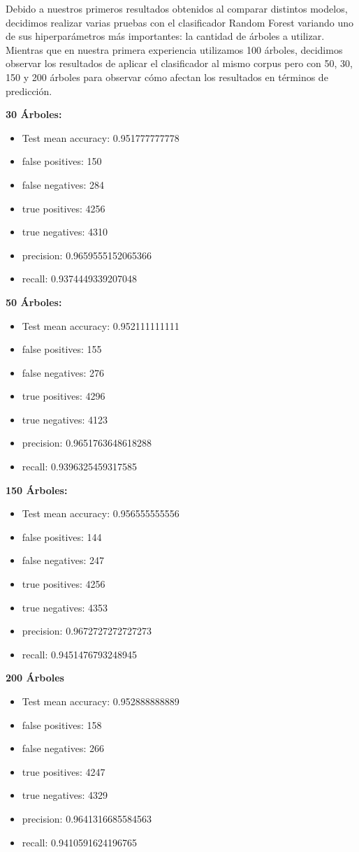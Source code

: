 \documentclass[10pt,a4paper]{article}
\begin{document}
Debido a nuestros primeros resultados obtenidos al comparar distintos modelos, decidimos realizar varias pruebas con el clasificador Random Forest variando uno de sus hiperparámetros más importantes: la cantidad de árboles a utilizar. Mientras que en nuestra primera experiencia utilizamos 100 árboles, decidimos observar los resultados de aplicar el clasificador al mismo corpus pero con 50, 30, 150 y 200 árboles para observar cómo afectan los resultados en términos de predicción.

\textbf{30 Árboles:}
\begin{itemize}
	\item Test mean accuracy: 0.951777777778
	\item false positives: 150
	\item false negatives: 284
	\item true positives:  4256
	\item true negatives:  4310
	\item precision: 0.9659555152065366
	\item recall: 0.9374449339207048
\end{itemize}

\textbf{50 Árboles:}
\begin{itemize}
	\item Test mean accuracy: 0.952111111111
	\item false positives: 155
	\item false negatives: 276
	\item true positives:  4296
	\item true negatives:  4123
	\item precision: 0.9651763648618288
	\item recall: 0.9396325459317585
\end{itemize}

\textbf{150 Árboles:}
\begin{itemize}
	\item Test mean accuracy: 0.956555555556
	\item false positives: 144
	\item false negatives: 247
	\item true positives:  4256
	\item true negatives:  4353
	\item precision: 0.9672727272727273
	\item recall: 0.9451476793248945
\end{itemize}

\textbf{200 Árboles}
\begin{itemize}
	\item Test mean accuracy: 0.952888888889
	\item false positives: 158
	\item false negatives: 266
	\item true positives:  4247
	\item true negatives:  4329
	\item precision: 0.9641316685584563
	\item recall: 0.9410591624196765
\end{itemize}
\end{document}
